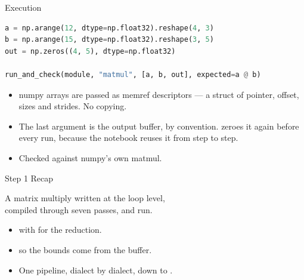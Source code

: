 \documentclass[aspectratio=169,10pt]{beamer}
\begin{document}
\begin{frame}[fragile]{Execution}
\begin{lstlisting}[language=Python,basicstyle=\ttfamily\scriptsize,keywordstyle=\color{scblue}]
a = np.arange(12, dtype=np.float32).reshape(4, 3)
b = np.arange(15, dtype=np.float32).reshape(3, 5)
out = np.zeros((4, 5), dtype=np.float32)

run_and_check(module, "matmul", [a, b, out], expected=a @ b)
\end{lstlisting}
  \vspace{0.5em}
  \begin{itemize}
    \item<2-> numpy arrays are passed as \alert{memref descriptors} --- a
      struct of pointer, offset, sizes and strides. No copying.
    \item<3-> The last argument is the output buffer, by convention.
       \alert{zeroes it again} before every run, because
      the notebook reuses it from step to step.
    \item<4-> Checked against numpy's own matmul.
  \end{itemize}
  \vspace{0.4em}
\end{frame}

\begin{frame}{Step 1 Recap}
  \begin{center}
    \large A matrix multiply written at the loop level,\\
    compiled through seven passes, and run.
  \end{center}
  \vspace{1em}
  \begin{itemize}
    \item<2->  with  for the reduction.
    \item<3->  so the bounds come from the buffer.
    \item<4-> One pipeline, dialect by dialect, down to .
  \end{itemize}
  \vspace{1em}
\end{frame}
\end{document}
